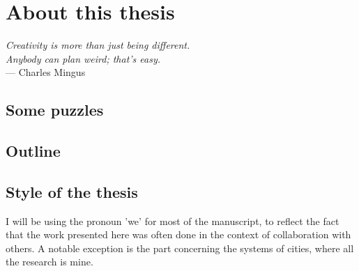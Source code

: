 

\chapter{About this thesis}
\label{chap:methodology}

\begin{flushright}{\slshape    
Creativity is more than just being different.\\
Anybody can plan weird; that's easy.
} \\ \medskip
--- Charles Mingus 
\end{flushright}


\section{Some puzzles}

\section{Outline}

\section{Style of the thesis}

I will be using the pronoun 'we' for most of the manuscript, to reflect the fact
that the work presented here was often done in the context of collaboration with others. A
notable exception is the part concerning the systems of cities, where all the
research is mine.

